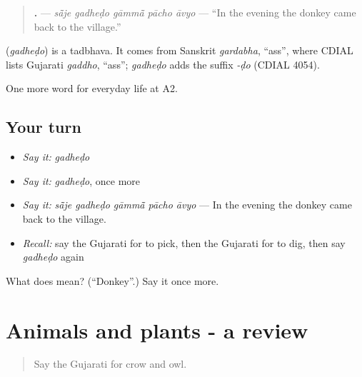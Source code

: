 \begin{quote}
\textbf{    .} — \emph{sā̃je gadheḍo gāmmā̃ pācho āvyo} — \textquotedblleft{}In the evening the donkey came back to the village.\textquotedblright{}
\end{quote}

\begin{cousinweb}
\textbf{} (\emph{gadheḍo}) is a tadbhava. It comes from Sanskrit \emph{gardabha}, \textquotedblleft{}ass\textquotedblright{}, where CDIAL lists Gujarati \emph{gaddho}, \textquotedblleft{}ass\textquotedblright{}; \emph{gadheḍo} adds the suffix \emph{-ḍo} (CDIAL 4054).
\end{cousinweb}

\begin{grammarlens}[title={What you've built}]
One more word for everyday life at A2.
\end{grammarlens}

\subsection*{Your turn}
\begin{itemize}
\raggedright
  \item \emph{Say it:} \emph{gadheḍo}
  \item \emph{Say it:} \emph{gadheḍo}, once more
  \item \emph{Say it:} \emph{sā̃je gadheḍo gāmmā̃ pācho āvyo} — In the evening the donkey came back to the village.
  \item \emph{Recall:} say the Gujarati for to pick, then the Gujarati for to dig, then say \emph{gadheḍo} again
\end{itemize}

\begin{tcolorbox}[breakable,colback=teal!4,colframe=teal!35!black,title={Before you move on}]
What does  mean? (\textquotedblleft{}Donkey\textquotedblright{}.) Say it once more.
\end{tcolorbox}
\section[(dialogue)]{Animals and plants - a review}

\label{lesson:GU-R242-review-237-242}



\begin{quote}
Say the Gujarati for crow and owl.
\end{quote}

